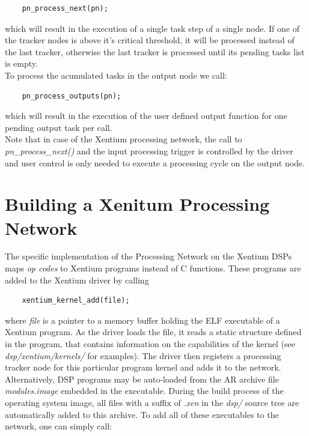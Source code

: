 \begin{lstlisting}
	pn_process_next(pn);
\end{lstlisting}

\noindent
which will result in the execution of a single task step of a single node.
If one of the tracker nodes is above it's critical threshold, it will be
processed instead of the last tracker, otherwise the last tracker is processed
until its pending tasks list is empty.
\\

\noindent
To process the acumulated tasks in the output node we call:

\begin{lstlisting}
	pn_process_outputs(pn);
\end{lstlisting}

\noindent
which will result in the execution of the user defined output function for
one pending output task per call.
\\

\noindent
Note that in case of the Xentium processing network, the call to
\emph{pn\_process\_next()} and the input processing trigger is controlled by
the driver and user control is only needed to execute a processing cycle on the
output node.

\section{Building a Xenitum Processing Network}


The specific implementation of the Processing Network on the Xentium DSPs maps
\emph{op codes} to Xentium programs instead of C functions. These programs
are added to the Xentium driver by calling

\begin{lstlisting}
	xentium_kernel_add(file);
\end{lstlisting}

\noindent
where \emph{file} is a pointer to a memory buffer holding the ELF executable
of a Xentium program. As the driver loads the file, it reads a static structure
defined in the program, that contains information on the capabilities of the
kernel (see \emph{dsp/xentium/kernels/} for examples). The driver then registers
a processing tracker node for this particular program kernel and adds it to the
network. Alternatively, DSP programs may be auto-loaded from the AR archive
file \emph{modules.image} embedded in the executable. During the build process
of the operating system image, all files with a suffix of \emph{.xen} in the
\emph{dsp/} source tree are automatically added to this archive. To add all
of these executables to the network, one can simply call:

